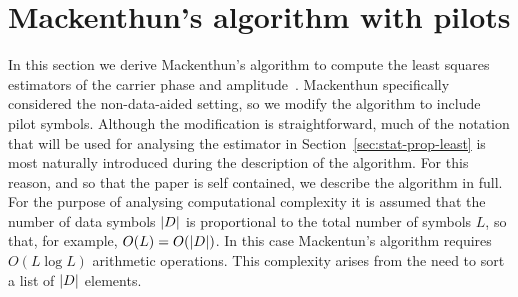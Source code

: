 \documentclass[journal]{IEEEtran}
\begin{document}
\section{Mackenthun's algorithm with pilots}\label{sec:least-squar-estim}

In this section we derive Mackenthun's algorithm to compute the least squares estimators of the carrier phase and amplitude~\cite{Mackenthun1994}.  Mackenthun specifically considered the non-data-aided setting, so we modify the algorithm to include pilot symbols.  Although the modification is straightforward, much of the notation that will be used for analysing the estimator in Section~\ref{sec:stat-prop-least} is most naturally introduced during the description of the algorithm.  For this reason, and so that the paper is self contained, we describe the algorithm in full.  For the purpose of analysing computational complexity it is assumed that the number of data symbols ${\left\vert D \right\vert}$ is proportional to the total number of symbols $L$, so that, for example, $O(L) = O({\left\vert D \right\vert})$.  In this case Mackentun's algorithm requires $O(L \log L)$ arithmetic operations.  This complexity arises from the need to sort a list of ${\left\vert D \right\vert}$ elements.  

\end{document}

